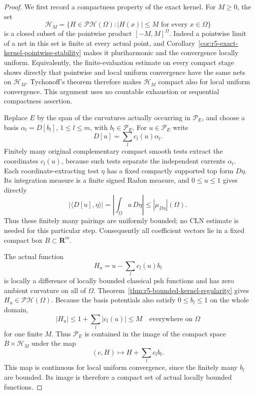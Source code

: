 \documentclass[11pt,a4paper]{article}
\numberwithin{equation}{section}
\theoremstyle{definition}
\theoremstyle{remark}
\begin{document}
\begin{proof}
We first record a compactness property of the exact kernel.
For $M\ge0$, the set
\[
 \mathscr H_M
       =\{H\in\mathscr{PH}(\Omega): |H(x)|\le M
                                      \text{ for every }x\in\Omega\}
\]
is a closed subset of the pointwise product
$[-M,M]^\Omega$.  Indeed a pointwise limit of a net in this
set is finite at every actual point, and
Corollary~\ref{cor:r5-exact-kernel-pointwise-stability} makes
it pluriharmonic and the convergence locally uniform.
Equivalently, the finite-evaluation estimate on every compact
stage shows directly that pointwise and local uniform
convergence have the same nets on $\mathscr H_M$.
Tychonoff's theorem therefore makes $\mathscr H_M$ compact
also for local uniform convergence.  This argument uses no
countable exhaustion or sequential compactness assertion.

Replace $E$ by the span of the curvatures actually occurring
in $\mathcal P_E$, and choose a basis
$\alpha_l=D[b_l]$, $1\le l\le m$, with
$b_l\in\mathcal P_E$.
For $u\in\mathcal P_E$ write
\[
                         D[u]=\sum_l c_l(u)\alpha_l.
\]
Finitely many original complementary compact smooth tests
extract the coordinates $c_l(u)$, because such tests
separate the independent currents $\alpha_l$.
Each coordinate-extracting test $\eta$ has a fixed compactly
supported top form $D\eta$.  Its integration measure is a
finite signed Radon measure, and $0\le u\le1$ gives directly
\[
       |\langle D[u],\eta\rangle|
          =\left|\int_\Omega u\,D\eta\right|
                         \le |\mu_{D\eta}|(\Omega).
\]
Thus these finitely many pairings are uniformly bounded;
no CLN estimate is needed for this particular step.
Consequently all coefficient vectors lie in a fixed compact
box $B\subset\mathbf R^m$.

The actual function
\[
                        H_u=u-\sum_l c_l(u)b_l
\]
is locally a difference of locally bounded classical psh
functions and has zero ambient curvature on all of $\Omega$.
Theorem~\ref{thm:r5-bounded-kernel-regularity} gives
$H_u\in\mathscr{PH}(\Omega)$.
Because the basis potentials also satisfy $0\le b_l\le1$
on the whole domain,
\[
                |H_u|\le1+\sum_l|c_l(u)|\le M
                          \quad\text{everywhere on }\Omega
\]
for one finite $M$.  Thus $\mathcal P_E$ is contained in
the image of the compact space $B\times\mathscr H_M$ under
the map
\[
                     (c,H)\longmapsto H+\sum_l c_l b_l.
\]
This map is continuous for local uniform convergence, since
the finitely many $b_l$ are bounded.  Its image is therefore
a compact set of actual locally bounded functions.


\end{proof}
\end{document}
